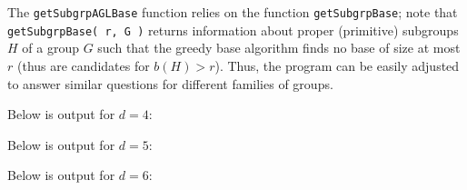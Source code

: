 The \texttt{getSubgrpAGLBase} function relies on the function \texttt{getSubgrpBase}; note that \texttt{getSubgrpBase( r, G )} returns information about proper (primitive) subgroups $H$ of a group $G$ such that the greedy base algorithm finds no base of size at most $r$ (thus are candidates for $b(H) > r$). Thus, the program can be easily adjusted to answer similar questions for different families of groups.



Below is output for $d = 4$:



Below is output for $d = 5$:



Below is output for $d = 6$:



% 